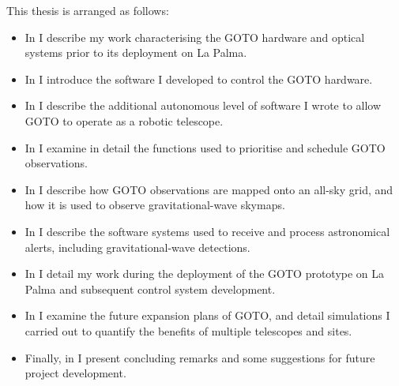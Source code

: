 \begin{colsection}
This thesis is arranged as follows:
%
\begin{itemize}
    \item In  I describe my work characterising the GOTO hardware and optical systems prior to its deployment on La Palma.
    \item In  I introduce the software I developed to control the GOTO hardware.
    \item In  I describe the additional autonomous level of software I wrote to allow GOTO to operate as a robotic telescope.
    \item In  I examine in detail the functions used to prioritise and schedule GOTO observations.
    \item In  I describe how GOTO observations are mapped onto an all-sky grid, and how it is used to observe gravitational-wave skymaps.
    \item In  I describe the software systems used to receive and process astronomical alerts, including gravitational-wave detections.
    \item In  I detail my work during the deployment of the GOTO prototype on La Palma and subsequent control system development.
    \item In  I examine the future expansion plans of GOTO, and detail simulations I carried out to quantify the benefits of multiple telescopes and sites.
    \item Finally, in  I present concluding remarks and some suggestions for future project development.
\end{itemize}

\end{colsection}


